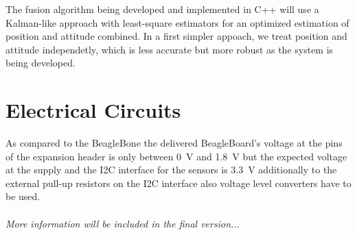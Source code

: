 The fusion algorithm being developed and implemented in C++ will use a Kalman-like approach with least-square estimators for an optimized estimation of position and attitude combined.
In a first simpler appoach, we treat position and attitude independetly, which is less accurate but more robust as the system is being developed.

\FloatBarrier
\section{Electrical Circuits}

As compared to the BeagleBone the delivered BeagleBoard's voltage at the pins
of the expansion header is only between 0~V and 1.8~V but the expected voltage
at the supply and the I2C interface for the sensors is 3.3~V additionally to
the external pull-up resistors on the I2C interface also voltage level
converters have to be used.
\\
\\
\textit{More information will be included in the final version...}